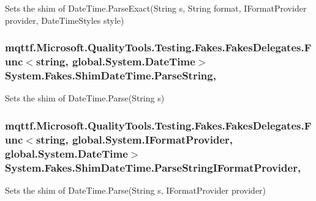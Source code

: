 Sets the shim of Date\-Time.\-Parse\-Exact(\-String s, String format, I\-Format\-Provider provider, Date\-Time\-Styles style)

\hypertarget{class_system_1_1_fakes_1_1_shim_date_time_ab9ef51dc091d59e7b3f94bed7a1d8ea5}{
\subsubsection[{Parse\-String}]{\setlength{\rightskip}{0pt plus 5cm}mqttf.\-Microsoft.\-Quality\-Tools.\-Testing.\-Fakes.\-Fakes\-Delegates.\-Func$<$string, global.\-System.\-Date\-Time$>$ System.\-Fakes.\-Shim\-Date\-Time.\-Parse\-String\hspace{0.3cm}{\ttfamily [static]}, {\ttfamily [set]}}}\label{class_system_1_1_fakes_1_1_shim_date_time_ab9ef51dc091d59e7b3f94bed7a1d8ea5}


Sets the shim of Date\-Time.\-Parse(\-String s)

\hypertarget{class_system_1_1_fakes_1_1_shim_date_time_a824794166e4ccb9388edf5a35be39ce3}{
\subsubsection[{Parse\-String\-I\-Format\-Provider}]{\setlength{\rightskip}{0pt plus 5cm}mqttf.\-Microsoft.\-Quality\-Tools.\-Testing.\-Fakes.\-Fakes\-Delegates.\-Func$<$string, global.\-System.\-I\-Format\-Provider, global.\-System.\-Date\-Time$>$ System.\-Fakes.\-Shim\-Date\-Time.\-Parse\-String\-I\-Format\-Provider\hspace{0.3cm}{\ttfamily [static]}, {\ttfamily [set]}}}\label{class_system_1_1_fakes_1_1_shim_date_time_a824794166e4ccb9388edf5a35be39ce3}


Sets the shim of Date\-Time.\-Parse(\-String s, I\-Format\-Provider provider)


